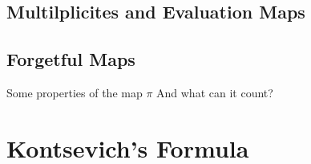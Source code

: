 \subsection{Multilplicites and Evaluation Maps}

\begin{definition}
    
\end{definition}

\begin{definition}
    
\end{definition}

\begin{definition}
    
\end{definition}

\begin{definition}
    
\end{definition}

\begin{remark}
    
\end{remark}

\begin{definition}
    
\end{definition}

\begin{definition}
    
\end{definition}
\subsection{Forgetful Maps}
\begin{definition}
    
\end{definition}

\begin{definition}
    
\end{definition}

Some properties of the map $\pi$ And what can it count?
\section{Kontsevich's Formula}
